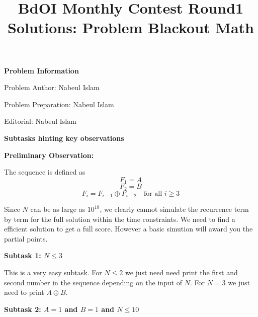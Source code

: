 \documentclass[12pt]{article}
\title{BdOI Monthly Contest  Round1 Solutions: Problem
Blackout Math}
\date{} %
\begin{document}
\maketitle


\vspace{0.3cm}

\textbf{\Large Problem Information}

\vspace{0.3cm}

{\large Problem Author: Nabeul Islam}

\vspace{0.3cm}

{\large Problem Preparation: Nabeul Islam}

\vspace{0.3cm}

{\large Editorial: Nabeul Islam}

\vspace{0.3cm}



\vspace{0.5cm}

\textbf{\Large Subtasks hinting key observations}

\vspace{0.3cm}

\textbf{\large Preliminary Observation:}

The sequence is defined as
$$F_1 = A$$$$F_2 = B$$$$F_i = F_{i-1} \oplus F_{i-2} \quad \text{for all } i \ge 3$$

Since $N$ can be as large as $10^{18}$, we clearly cannot simulate the recurrence term by term for the full solution within the time constraints. We need to find a efficient solution  to get a full score. However a basic simution will award you the partial points.

\vspace{0.3cm}

\textbf{\large Subtask 1: $N \le 3$}
\vspace{0.3cm}

This is a very easy subtask. For $N \le2$ we just need need print the first and second number in the sequence depending on the input of $N$. For $N=3$ we just need to print $A \oplus B$.


\vspace{0.3cm}

\textbf{\large Subtask 2: $A = 1$ and $B = 1$ and $N \le 10$}

\vspace{0.3cm}
\end{document}
